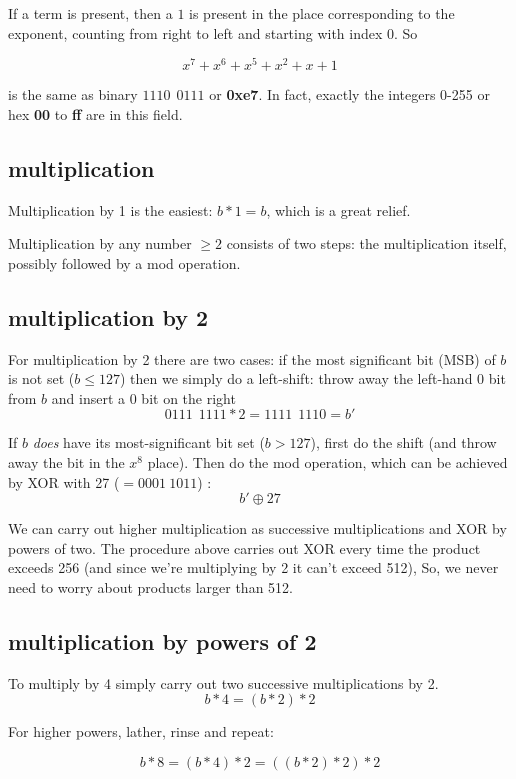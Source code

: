 \documentclass[11pt, oneside]{article}
\begin{document}
If a term is present, then a $1$ is present in the place corresponding to the exponent, counting from right to left and starting with index 0. So

\[ x^7 + x^6 + x^5 + x^2 + x + 1 \]

is the same as binary $1110 \  \  0111$ or \textbf{0xe7}.  In fact, exactly the integers 0-255 or hex \textbf{00} to \textbf{ff} are in this field.

\subsection*{multiplication}

Multiplication by 1 is the easiest:  $b * 1 = b$, which is a great relief.

Multiplication by any number $\ge 2$ consists of two steps:  the multiplication itself, possibly followed by a mod operation.

\subsection*{multiplication by 2}

For multiplication by 2 there are two cases:  if the most significant bit (MSB) of $b$ is not set ($b \le 127$) then we simply do a left-shift:  throw away the left-hand 0 bit from $b$ and insert a $0$ bit on the right
\[ 0111 \  \  1111 * 2 =  1111 \  \  1110 = b' \]

If $b$ \emph{does} have its most-significant bit set ($b > 127$), first do the shift (and throw away the bit in the $x^8$ place).  Then do the mod operation, which can be achieved by XOR with 27 ($ = 0001\ 1011$)	:
\[ b' \oplus 27 \]

We can carry out higher multiplication as successive multiplications and XOR by powers of two.  The procedure above carries out XOR every time the product exceeds 256 (and since we're multiplying by 2 it can't exceed 512),  So, we never need to worry about products larger than 512.

\subsection*{multiplication by powers of 2}

To multiply by 4 simply carry out two successive multiplications by 2.
\[ b * 4 = (b * 2) * 2 \]

For higher powers, lather, rinse and repeat:

\[ b * 8 = (b * 4) * 2 = ((b * 2) * 2) * 2 \]
\end{document}
